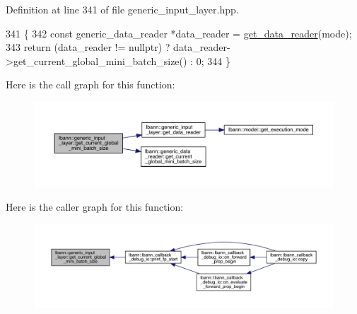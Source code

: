 Definition at line 341 of file generic\+\_\+input\+\_\+layer.\+hpp.


\begin{DoxyCode}
341                                                                             \{
342     \textcolor{keyword}{const} generic\_data\_reader *data\_reader = \hyperlink{classlbann_1_1generic__input__layer_aba732becdb02627e3ad4493ac19e8fb6}{get\_data\_reader}(mode);
343     \textcolor{keywordflow}{return} (data\_reader != \textcolor{keyword}{nullptr}) ? data\_reader->get\_current\_global\_mini\_batch\_size() : 0;
344   \}
\end{DoxyCode}
Here is the call graph for this function\+:\nopagebreak
\begin{figure}[H]
\begin{center}
\leavevmode
\includegraphics[width=350pt]{classlbann_1_1generic__input__layer_ae8252d343e2f287dd7cece935ea5a075_cgraph}
\end{center}
\end{figure}
Here is the caller graph for this function\+:\nopagebreak
\begin{figure}[H]
\begin{center}
\leavevmode
\includegraphics[width=350pt]{classlbann_1_1generic__input__layer_ae8252d343e2f287dd7cece935ea5a075_icgraph}
\end{center}
\end{figure}
\mbox{\label{classlbann_1_1generic__input__layer_aaaa60fb7b94353fccaff25e6a862d833}} 

